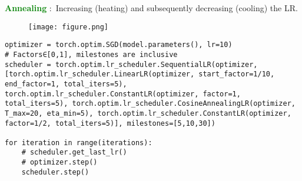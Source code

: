 \documentclass{article}
\newcommand{\define}[1]{
    \textcolor{green}{\textbf{#1}}
}
\begin{document}
\define{Annealing}:\ Increasing (heating) and subsequently decreasing (cooling) the LR.

\begin{figure}
\Centering
\texttt{[image: figure.png]}
\end{figure}

\begin{lstlisting}[caption={PyTorch code}]
optimizer = torch.optim.SGD(model.parameters(), lr=10)
# Factors∈[0,1], milestones are inclusive
scheduler = torch.optim.lr_scheduler.SequentialLR(optimizer,[torch.optim.lr_scheduler.LinearLR(optimizer, start_factor=1/10, end_factor=1, total_iters=5), torch.optim.lr_scheduler.ConstantLR(optimizer, factor=1, total_iters=5), torch.optim.lr_scheduler.CosineAnnealingLR(optimizer, T_max=20, eta_min=5), torch.optim.lr_scheduler.ConstantLR(optimizer, factor=1/2, total_iters=5)], milestones=[5,10,30])

for iteration in range(iterations):
    # scheduler.get_last_lr()
    # optimizer.step()
    scheduler.step()
\end{lstlisting}
\end{document}
